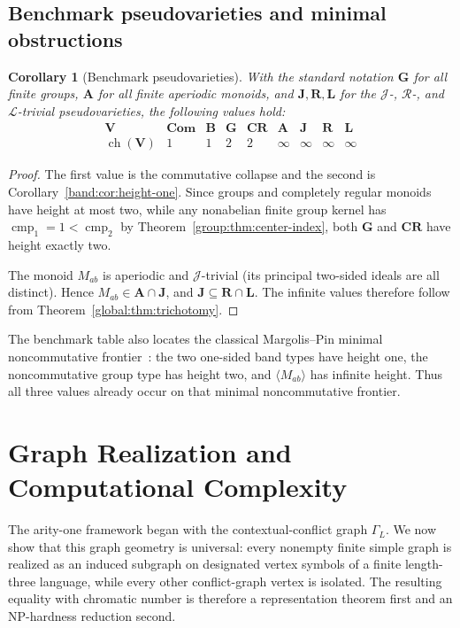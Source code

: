 \documentclass[10pt,a4paper]{article}
\newtheorem{corollary}[theorem]{Corollary}
\theoremstyle{definition}
\theoremstyle{remark}
\newcommand{\cmp}{\operatorname{cmp}}
\begin{document}
\subsection{Benchmark pseudovarieties and minimal obstructions}

\begin{corollary}[Benchmark pseudovarieties]
\label{global:cor:benchmarks}
With the standard notation \(\mathbf G\) for all finite groups,
\(\mathbf A\) for all finite aperiodic monoids, and
\(\mathbf J,\mathbf R,\mathbf L\) for the \(\mathcal J\)-,
\(\mathcal R\)-, and \(\mathcal L\)-trivial pseudovarieties, the following
values hold:
\[
\begin{array}{c|cccccccc}
\mathbf V
&\mathbf{Com}&\mathbf B&\mathbf G&\mathbf{CR}
&\mathbf A&\mathbf J&\mathbf R&\mathbf L\\
\hline
\operatorname{ch}(\mathbf V)
&1&1&2&2&\infty&\infty&\infty&\infty
\end{array}
\]
\end{corollary}

\begin{proof}
The first value is the commutative collapse and the second is
Corollary~\ref{band:cor:height-one}.  Since groups and completely regular
monoids have height at most two, while any nonabelian finite group kernel has
\(\cmp_1=1<\cmp_2\) by Theorem~\ref{group:thm:center-index}, both
\(\mathbf G\) and \(\mathbf{CR}\) have height exactly two.

The monoid \(M_{ab}\) is aperiodic and \(\mathcal J\)-trivial (its principal
two-sided ideals are all distinct).  Hence
\(M_{ab}\in\mathbf A\cap\mathbf J\), and
\(\mathbf J\subseteq\mathbf R\cap\mathbf L\).  The infinite values therefore
follow from Theorem~\ref{global:thm:trichotomy}.
\end{proof}


The benchmark table also locates the classical Margolis--Pin minimal
noncommutative frontier~\cite{MargolisPin1984}: the two one-sided band types
have height one, the noncommutative group type has height two, and
\(\langle M_{ab}\rangle\) has infinite height.  Thus all three values already
occur on that minimal noncommutative frontier.


\section{Graph Realization and Computational Complexity}
\label{sec:graph-universality}

The arity-one framework began with the contextual-conflict graph \(\Gamma_L\).
We now show that this graph geometry is universal: every nonempty finite simple graph is
realized as an induced subgraph on designated vertex symbols of a finite
length-three language, while every other conflict-graph vertex is isolated.
The resulting equality with chromatic number is therefore a representation
theorem first and an NP-hardness reduction second.
\end{document}
